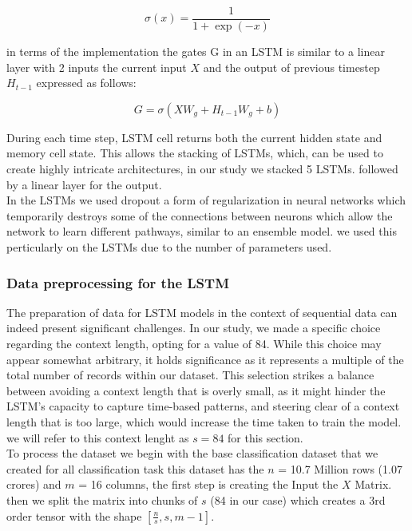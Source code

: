 \documentclass{article}
\begin{document}
\begin{equation}
    \sigma(x) = \frac{1}{1+\exp(-x)}
\end{equation}

in terms of the implementation the gates G in an LSTM is similar to a linear layer with 2 inputs the current input $X$ and the output of previous timestep $H_{t-1}$ expressed as follows:

\begin{equation}
    G = \sigma(XW_g + H_{t-1}W_g + b)
\end{equation}

During each time step, LSTM cell returns both the current hidden state and memory cell state. This allows the stacking of LSTMs, which, can be used to create highly intricate architectures, in our study we stacked 5 LSTMs. followed by a linear layer for the output.\\

In the LSTMs we used dropout a form of regularization in neural networks which temporarily destroys some of the connections between neurons which allow the network to learn different pathways, similar to an ensemble model. we used this perticularly on the LSTMs due to the number of parameters used. \cite{srivastava2014} 

\subsubsection{Data preprocessing for the LSTM}

The preparation of data for LSTM models in the context of sequential data can indeed present significant challenges. In our study, we made a specific choice regarding the context length, opting for a value of 84. While this choice may appear somewhat arbitrary, it holds significance as it represents a multiple of the total number of records within our dataset. This selection strikes a balance between avoiding a context length that is overly small, as it might hinder the LSTM's capacity to capture time-based patterns, and steering clear of a context length that is too large, which would increase the time taken to train the model. we will refer to this context lenght as $s = 84$ for this section.\\

To process the dataset we begin with the base classification dataset that we created for all classification task this dataset has the $n$ = 10.7 Million rows (1.07 crores) and $m$ = 16 columns, the first step is creating the Input the $X$ Matrix. then we split the matrix into chunks of $s$ (84 in our case) which creates a 3rd order tensor with the shape $\left[ \frac{n}{s}, s, m - 1 \right]$.\\
\end{document}
